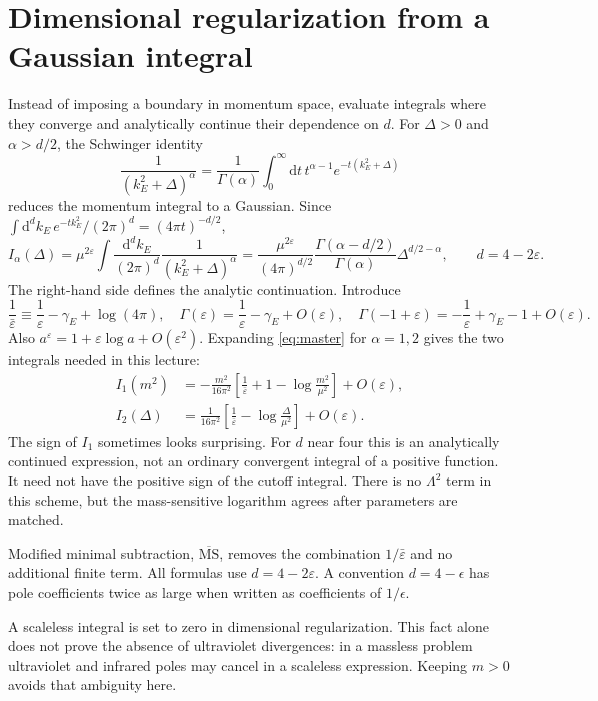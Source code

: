 \documentclass[11pt]{article}
\newcommand{\dd}{\mathrm d}
\newcommand{\eps}{\varepsilon}
\newcommand{\MSbar}{\overline{\mathrm{MS}}}
\newcommand{\module}[1]{\clearpage\section{#1}}
\begin{document}
\module{Dimensional regularization from a Gaussian integral}
Instead of imposing a boundary in momentum space, evaluate integrals
where they converge and analytically continue their dependence on
\(d\). For \(\Delta>0\) and \(\alpha>d/2\), the Schwinger identity
\begin{equation}
 \frac{1}{(k_E^2+\Delta)^\alpha}
 =\frac{1}{\Gamma(\alpha)}\int_0^\infty\dd t\,
 t^{\alpha-1}e^{-t(k_E^2+\Delta)}
\end{equation}
reduces the momentum integral to a Gaussian. Since
\(\int\dd^d k_E\,e^{-t k_E^2}/(2\pi)^d=(4\pi t)^{-d/2}\),
\begin{equation}
 I_\alpha(\Delta)=\mu^{2\eps}\int\frac{\dd^d k_E}{(2\pi)^d}
 \frac{1}{(k_E^2+\Delta)^\alpha}
 =\frac{\mu^{2\eps}}{(4\pi)^{d/2}}
 \frac{\Gamma(\alpha-d/2)}{\Gamma(\alpha)}
 \Delta^{d/2-\alpha},\qquad d=4-2\eps.             \label{eq:master}
\end{equation}
The right-hand side defines the analytic continuation. Introduce
\begin{equation}
 \frac{1}{\bar\eps}\equiv\frac1\eps-\gamma_E+\log(4\pi),
 \quad \Gamma(\eps)=\frac1\eps-\gamma_E+O(\eps),
 \quad \Gamma(-1+\eps)=-\frac1\eps+\gamma_E-1+O(\eps).
 \label{eq:epsbar}
\end{equation}
Also \(a^\eps=1+\eps\log a+O(\eps^2)\). Expanding \eqref{eq:master}
for \(\alpha=1,2\) gives the two integrals needed in this lecture:
\begin{align}
 I_1(m^2)&=-\frac{m^2}{16\pi^2}
 \left[\frac1{\bar\eps}+1-\log\frac{m^2}{\mu^2}\right]+O(\eps),
 \label{eq:I1}\\
 I_2(\Delta)&=\frac{1}{16\pi^2}
 \left[\frac1{\bar\eps}-\log\frac{\Delta}{\mu^2}\right]+O(\eps).
 \label{eq:I2}
\end{align}
The sign of \(I_1\) sometimes looks surprising. For \(d\) near four
this is an analytically continued expression, not an ordinary
convergent integral of a positive function. It need not have the
positive sign of the cutoff integral. There is no \(\Lambda^2\) term
in this scheme, but the mass-sensitive logarithm agrees after
parameters are matched.

\begin{keyidea}
Modified minimal subtraction, \(\MSbar\), removes the combination
\(1/\bar\eps\) and no additional finite term. All formulas use
\(d=4-2\eps\). A convention \(d=4-\epsilon\) has pole coefficients
twice as large when written as coefficients of \(1/\epsilon\).
\end{keyidea}
A scaleless integral is set to zero in dimensional regularization.
This fact alone does not prove the absence of ultraviolet divergences:
in a massless problem ultraviolet and infrared poles may cancel in a
scaleless expression. Keeping \(m>0\) avoids that ambiguity here.
\end{document}
